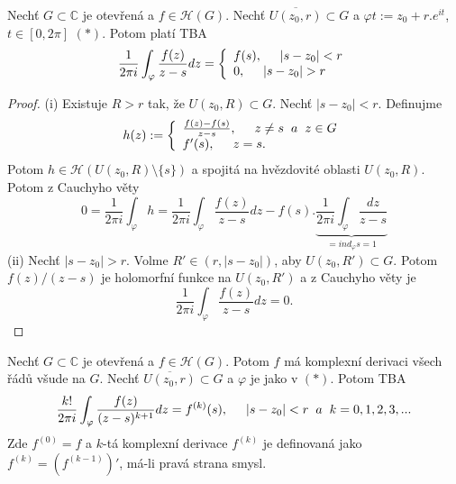 
\begin{theorem}
Nechť $G\subset{\mathbb{C}}$ je otevřená a $f\in\mathcal{H}(G)$. Nechť $\overline{U(z_0,r)}\subset{G}$ a $\varphi{{t}}:=z_0+r.e^{it}$, $t\in{[0,2\pi]}$ $(*)$. Potom platí TBA
\[\frac{1}{2\pi{i}}\int_\varphi{\frac{f(z)}{z-s}dz}=
\left\{
	\begin{array}{ll}
		f(s), \hspace{5mm} |s-z_0|<r\\
		0,\hspace{5mm} |s-z_0|>r
	\end{array}
\right.
\]\end{theorem}

\begin{proof}
(i) Existuje $R>r$ tak, že $U(z_0,R)\subset{G}$. Nechť $|s-z_0|<r$. Definujme 
\[h(z):=
\left\{
	\begin{array}{ll}
		\frac{f(z)-f(s)}{z-s},\hspace{5mm}z\neq{s}\hspace{2mm} a\hspace{2mm} z\in{G}\\
		f'(s),\hspace{5mm}z=s.
	\end{array}
\right.\]
Potom $h\in\mathcal{H}(U(z_0,R)\setminus\{s\})$ a spojitá na hvězdovité oblasti $U(z_0,R)$. Potom z Cauchyho věty 
\[0=
\frac{1}{2\pi{i}}\int_\varphi{h}=
\frac{1}{2\pi{i}}\int_\varphi{\frac{f(z)}{z-s}}dz-f(s).\underbrace{\frac{1}{2\pi{i}}\int_\varphi{\frac{dz}{z-s}}}_{=ind_\varphi{s} = 1}
\]
(ii) Nechť $|s-z_0|>r$. Volme $R'\in(r,|s-z_0|)$, aby $U(z_0,R')\subset{G}$. Potom $f(z)/(z-s)$ je holomorfní funkce na $U(z_0,R')$ a z Cauchyho věty je 
\[\frac{1}{2\pi{i}}\int_\varphi{\frac{f(z)}{z-s}}dz =0.\]
\end{proof}

\begin{consequence}
Nechť $G\subset{\mathbb{C}}$ je otevřená a $f\in\mathcal{H}(G)$. Potom $f$ má komplexní derivaci všech řádů všude na $G$. Nechť $\overline{U(z_0,r)}\subset{G}$ a $\varphi$ je jako v $(*)$. Potom TBA
\[\frac{k!}{2\pi{i}}\int_\varphi{\frac{f(z)}{(z-s)^{k+1}}}dz=f^{(k)}(s),\hspace{5mm} |s-z_0|<r\hspace{2mm} a\hspace{2mm} k = 0,1,2,3,... \]
Zde $f^{(0)}=f$ a $k$-tá komplexní derivace $f^{(k)}$ je definovaná jako $f^{(k)}=(f^{(k-1)})'$, má-li pravá strana smysl.
\end{consequence}

